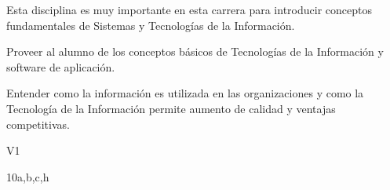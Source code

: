 \begin{syllabus}


\begin{justification}
Esta disciplina es muy importante en esta carrera para introducir conceptos fundamentales de Sistemas y Tecnologías de la Información.
\end{justification}

\begin{goals}
\item Proveer al alumno de los conceptos básicos de Tecnologías de la Información y software de aplicación.
\item Entender como la información es utilizada en las organizaciones y como la Tecnología de la Información permite aumento de calidad y ventajas competitivas.
\end{goals}

\begin{outcomes}{V1}
   \item {}
   \item {}
   \item {}
   \item {}
   \item {}
   \item {}
   \item {}
   \item {}
\end{outcomes}

\begin{unit}{\LUFIVEDef}{}{\LUFIVEBib}{10}{a,b,c,h}
   \begin{topics}
      \item \OMCTWOTopicTWOxTWOxONEOH
      \item \TDSONETopicTHREExONExONE
      \item \TDSONETopicTHREExONExTWO
      \item \TDSONETopicTHREExONExTHREE
      \item \TDSONETopicTHREExONExFOUR
      \item \TDSONETopicTHREExONExFIVE
   \end{topics}
	\LUFIVEGoal
\end{unit}

\begin{coursebibliography}
\end{coursebibliography}

\end{syllabus}
